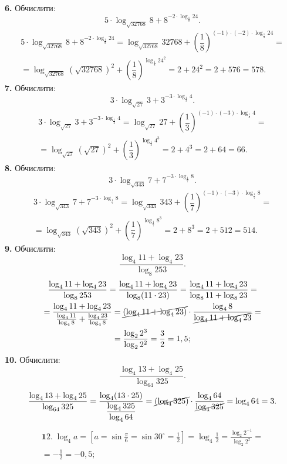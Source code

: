 \textbf{6.} Обчислити:
$$
5\cdot\log_{\sqrt{32768}}8+8^{-2\cdot\log_{\frac{1}{8}}24}.
$$
\begin{multline*}
5\cdot\log_{\sqrt{32768}}8+8^{-2\cdot\log_{\frac{1}{8}}24}=
\log_{\sqrt{32768}}32768+\left(\dfrac{1}{8}\right)^{(-1)\cdot(-2)\cdot\log_{\frac{1}{8}}24}=\\
=\log_{\sqrt{32768}}\left(\sqrt{32768}\right)^2+\left(\dfrac{1}{8}\right)^{\log_{\frac{1}{8}}24^2}=
2+24^2=2+576=578.
\end{multline*}
\textbf{7.} Обчислити:
$$
3\cdot\log_{\sqrt{27}}3+3^{-3\cdot\log_{\frac{1}{3}}4}.
$$
\begin{multline*}
3\cdot\log_{\sqrt{27}}3+3^{-3\cdot\log_{\frac{1}{3}}4}=
\log_{\sqrt{27}}27+\left(\dfrac{1}{3}\right)^{(-1)\cdot(-3)\cdot\log_{\frac{1}{3}}4}=\\
=\log_{\sqrt{27}}\left(\sqrt{27}\right)^2+\left(\dfrac{1}{3}\right)^{\log_{\frac{1}{3}}4^3}=
2+4^3=2+64=66.
\end{multline*}
\textbf{8.} Обчислити:
$$
3\cdot\log_{\sqrt{343}}7+7^{-3\cdot\log_{\frac{1}{7}}8}.
$$
\begin{multline*}
3\cdot\log_{\sqrt{343}}7+7^{-3\cdot\log_{\frac{1}{7}}8}=
\log_{\sqrt{343}}343+\left(\dfrac{1}{7}\right)^{(-1)\cdot(-3)\cdot\log_{\frac{1}{7}}8}=\\
=\log_{\sqrt{343}}\left(\sqrt{343}\right)^2+\left(\dfrac{1}{7}\right)^{\log_{\frac{1}{7}}8^3}=
2+8^3=2+512=514.
\end{multline*}
\textbf{9.} Обчислити:
$$
\frac{\log_4 11 + \log_4 23}{\log_8 253}.
$$
\begin{multline*}
\frac{\log_4 11 + \log_4 23}{\log_8 253} =
\frac{\log_4 11 + \log_4 23}{\log_8 (11 \cdot 23)} =
\frac{\log_4 11 + \log_4 23}{\log_8 11 + \log_8 23} =\\
= \frac{\log_4 11 + \log_4 23}{\frac{\log_4 11}{\log_4 8} + \frac{\log_4 23}{\log_4 8}} =
\cancel{\left(\log_4 11 + \log_4 23\right)} \cdot \frac{\log_4 8}{\cancel{\log_4 11 + \log_4 23}} =\\
= \frac{\log_2 2^3}{\log_2 2^2} = \frac{3}{2} = 1,5;
\end{multline*}
\textbf{10.} Обчислити:
$$
\dfrac{\log_{4}13+\log_{4}25}{\log_{64}325}.
$$
\begin{multline*}
\dfrac{\log_{4}13+\log_{4}25}{\log_{64}325}=
\dfrac{\log_{4}(13\cdot25)}{\dfrac{\log_{4}325}{\log_{4}64}}=
\cancel{\left(\log_{4}325\right)}\cdot\dfrac{\log_{4}64}{\cancel{\log_{4}325}}=
\log_{4}64=3.
\end{multline*}
\begin{multline*}
{\mathbf 12.}\;
\log_4 a =
\left[a = \sin \frac{\pi}{6} = \sin 30^\circ = \frac{1}{2}\right] =
\log_4 \frac{1}{2} =
\frac{\log_2 2^{-1}}{\log_2 2^2} =\\
= -\frac{1}{2} = -0,5;
\end{multline*}

